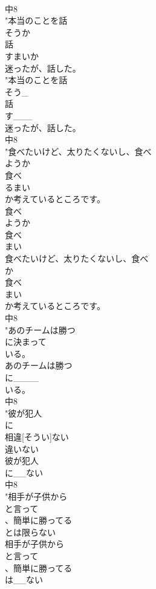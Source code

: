 \documentclass[8pt]{extreport}
\begin{document}
\begin{CJK}{UTF8}{min}
\\	中8
\\	"本当のことを話
\\	そうか
\\	話
\\	すまいか
\\	迷ったが、話した。
\\	"本当のことを話
\\	そう_
\\	話
\\	す___
\\	迷ったが、話した。
\\	中8
\\	"食べたいけど、太りたくないし、食べ
\\	ようか
\\	食べ
\\	るまい
\\	か考えているところです。 
\\	食べ
\\	ようか
\\	食べ
\\	まい
\\	食べたいけど、太りたくないし、食べ
\\	か
\\	食べ
\\	まい
\\	か考えているところです。
\\	中8
\\	"あのチームは勝つ
\\	に決まって
\\	いる。
\\	あのチームは勝つ
\\	に____
\\	いる。
\\	中8
\\	"彼が犯人
\\	に
\\	相違[そうい]ない
\\	違いない 
\\	彼が犯人
\\	に__ない
\\	中8
\\	"相手が子供から
\\	と言って
\\	、簡単に勝ってる
\\	とは限らない
\\	相手が子供から
\\	と言って
\\	、簡単に勝ってる
\\	は__ない

\end{CJK}
\end{document}
